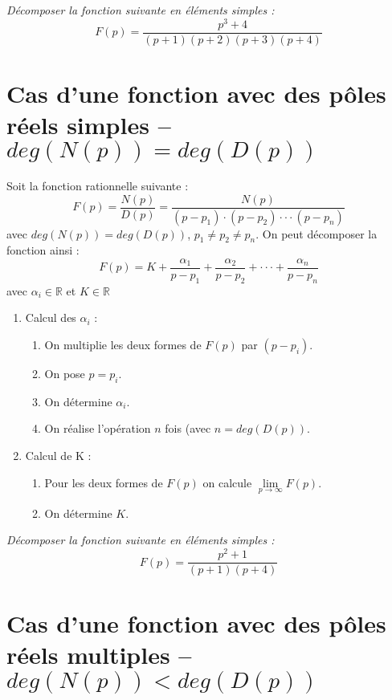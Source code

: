 \documentclass[11pt,oneside]{article}
\begin{document}
\begin{exemple}
\textit{Décomposer la fonction suivante en éléments simples :}
$$
F(p)=\dfrac{p^3+4}{(p+1)(p+2)(p+3)(p+4)}
$$
\end{exemple}

\section{Cas d'une fonction avec des pôles réels simples -- $deg(N(p)) = deg(D(p))$}

\begin{resultat}
Soit la fonction rationnelle suivante :
$$
F(p) = \dfrac{N(p)}{D(p)} =\dfrac{N(p)}{(p-p_1)\cdot (p-p_2)\cdot \cdot \cdot (p-p_n)}
$$
avec $deg(N(p)) = deg(D(p))$, $p_1\neq p_2\neq p_n$. On peut décomposer la fonction ainsi :
$$
F(p) = K + \dfrac{\alpha_1}{p-p_1} + \dfrac{\alpha_2}{p-p_2} 
+ \cdot \cdot \cdot + 
\dfrac{\alpha_n}{p-p_n} 
$$
avec $\alpha_i\in \mathbb{R}$ et $K \in \mathbb{R}$
\end{resultat}

\begin{methode}
\begin{enumerate}
\item Calcul des $\alpha_i$ :
\begin{enumerate}
\item On multiplie les deux formes de $F(p)$ par $(p-p_i)$.
\item On pose $p=p_i$.
\item On détermine $\alpha_i$.
\item On réalise l'opération $n$ fois (avec $n=deg(D(p))$.
\end{enumerate}
\item Calcul de K : 
\begin{enumerate}
\item Pour les deux formes de $F(p)$ on calcule $\lim\limits_{p\to\infty} F(p)$.
\item On détermine $K$.
\end{enumerate}
\end{enumerate}
\end{methode}

\begin{exemple}
\textit{Décomposer la fonction suivante en éléments simples :}
$$
F(p)=\dfrac{p^2+1}{(p+1)(p+4)}
$$
\end{exemple}


\section{Cas d'une fonction avec des pôles réels multiples -- $deg(N(p)) < deg(D(p))$}
\end{document}
